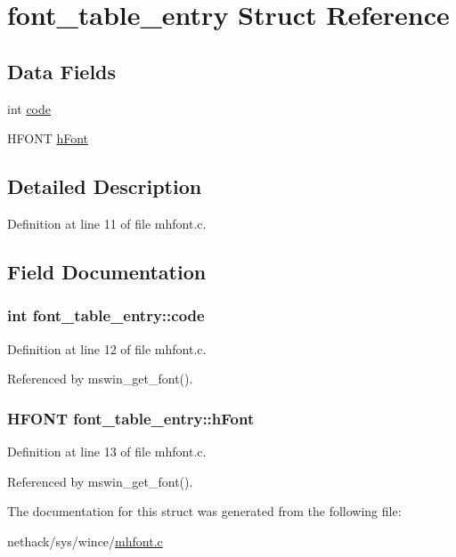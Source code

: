 \hypertarget{structfont__table__entry}{\section{font\+\_\+table\+\_\+entry Struct Reference}
\label{structfont__table__entry}
}
\subsection*{Data Fields}
\begin{DoxyCompactItemize}
\item 
int \hyperlink{structfont__table__entry_a613ac8f9549d6cf562d60f7dc1bab5a4}{code}
\item 
H\+F\+O\+N\+T \hyperlink{structfont__table__entry_af0c047e6f34a07dcaacef8c48d73de5a}{h\+Font}
\end{DoxyCompactItemize}


\subsection{Detailed Description}


Definition at line 11 of file mhfont.\+c.



\subsection{Field Documentation}
\hypertarget{structfont__table__entry_a613ac8f9549d6cf562d60f7dc1bab5a4}{
\subsubsection[{code}]{\setlength{\rightskip}{0pt plus 5cm}int font\+\_\+table\+\_\+entry\+::code}}\label{structfont__table__entry_a613ac8f9549d6cf562d60f7dc1bab5a4}


Definition at line 12 of file mhfont.\+c.



Referenced by mswin\+\_\+get\+\_\+font().

\hypertarget{structfont__table__entry_af0c047e6f34a07dcaacef8c48d73de5a}{
\subsubsection[{h\+Font}]{\setlength{\rightskip}{0pt plus 5cm}H\+F\+O\+N\+T font\+\_\+table\+\_\+entry\+::h\+Font}}\label{structfont__table__entry_af0c047e6f34a07dcaacef8c48d73de5a}


Definition at line 13 of file mhfont.\+c.



Referenced by mswin\+\_\+get\+\_\+font().



The documentation for this struct was generated from the following file\+:\begin{DoxyCompactItemize}
\item 
nethack/sys/wince/\hyperlink{sys_2wince_2mhfont_8c}{mhfont.\+c}\end{DoxyCompactItemize}

